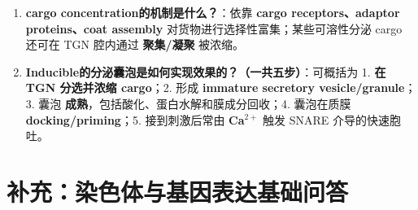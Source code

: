 \documentclass[12pt,fontset=none]{ctexart}
\begin{document}
\begin{enumerate}
\item \textbf{cargo concentration的机制是什么？}：依靠 \textbf{cargo receptors、adaptor proteins、coat assembly} 对货物进行选择性富集；某些可溶性分泌 cargo 还可在 TGN 腔内通过 \textbf{聚集/凝聚} 被浓缩。

\item \textbf{Inducible的分泌囊泡是如何实现效果的？（一共五步）}：可概括为 1. \textbf{在 TGN 分选并浓缩 cargo}；2. 形成 \textbf{immature secretory vesicle/granule}；3. 囊泡 \textbf{成熟}，包括酸化、蛋白水解和膜成分回收；4. 囊泡在质膜 \textbf{docking/priming}；5. 接到刺激后常由 \textbf{Ca$^{2+}$} 触发 SNARE 介导的快速胞吐。
\end{enumerate}

\section*{补充：染色体与基因表达基础问答}
\end{document}
